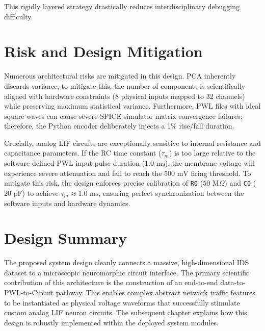 This rigidly layered strategy drastically reduces interdisciplinary debugging difficulty.

\section{Risk and Design Mitigation}

Numerous architectural risks are mitigated in this design. PCA inherently discards variance; to mitigate this, the number of components is scientifically aligned with hardware constraints (8 physical inputs mapped to 32 channels) while preserving maximum statistical variance. Furthermore, PWL files with ideal square waves can cause severe SPICE simulator matrix convergence failures; therefore, the Python encoder deliberately injects a 1\% rise/fall duration. 

Crucially, analog LIF circuits are exceptionally sensitive to internal resistance and capacitance parameters. If the RC time constant ($\tau_m$) is too large relative to the software-defined PWL input pulse duration ($1.0\text{ ms}$), the membrane voltage will experience severe attenuation and fail to reach the $500\text{ mV}$ firing threshold. To mitigate this risk, the design enforces precise calibration of \texttt{R0} ($50\text{ M}\Omega$) and \texttt{C0} ($20\text{ pF}$) to achieve $\tau_m \approx 1.0\text{ ms}$, ensuring perfect synchronization between the software inputs and hardware dynamics.

\section{Design Summary}

The proposed system design cleanly connects a massive, high-dimensional IDS dataset to a microscopic neuromorphic circuit interface. The primary scientific contribution of this architecture is the construction of an end-to-end data-to-PWL-to-Circuit pathway. This enables complex abstract network traffic features to be instantiated as physical voltage waveforms that successfully stimulate custom analog LIF neuron circuits. The subsequent chapter explains how this design is robustly implemented within the deployed system modules.

